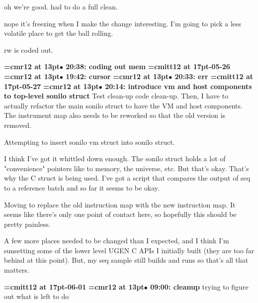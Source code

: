 oh we're good. had to do a full clean.
\par

nope it's freezing when I make the change interesting. I'm going to pick a less volatile place to get the ball rolling.
\par

rw is coded out.
\par

{\smallskip\noindent\bf\font\titlefont=cmr12 at 13pt\titlefont $\bullet$ 20:38: coding out mem}\smallskip
{\medskip\noindent\bf\font\titlefont=cmitt12 at 17pt-05-26}\medskip
{\smallskip\noindent\bf\font\titlefont=cmr12 at 13pt\titlefont $\bullet$ 19:42: cursor}\smallskip
{\smallskip\noindent\bf\font\titlefont=cmr12 at 13pt\titlefont $\bullet$ 20:33: err}\smallskip
{\medskip\noindent\bf\font\titlefont=cmitt12 at 17pt-05-27}\medskip
{\smallskip\noindent\bf\font\titlefont=cmr12 at 13pt\titlefont $\bullet$ 20:14: introduce vm and host components to top-level sonilo struct}\smallskip
Test clean-up code clean-up. Then, I have to actually refactor the main sonilo struct to have the VM and host components. The instrument map also needs to be reworked so that the old version is removed.
\par

Attempting to insert sonilo vm struct into sonilo struct.
\par

I think I've got it whittled down enough. The sonilo struct holds a lot of "convenience" pointers like to memory, the universe, etc. But that's okay. That's why the C struct is being used. I've got a script that compares the output of seq to a reference batch and so far it seems to be okay.
\par

Moving to replace the old instruction map with the new instruction map. It seems like there's only one point of contact here, so hopefully this should be pretty painless.
\par

A few more places needed to be changed than I expected, and I think I'm sunsetting some of the lower level UGEN C APIs I initially built (they are too far behind at this point). But, my seq sample still builds and runs so that's all that matters.
\par

{\medskip\noindent\bf\font\titlefont=cmitt12 at 17pt-06-01}\medskip
{\smallskip\noindent\bf\font\titlefont=cmr12 at 13pt\titlefont $\bullet$ 09:00: cleanup}\smallskip
trying to figure out what is left to do
\par

